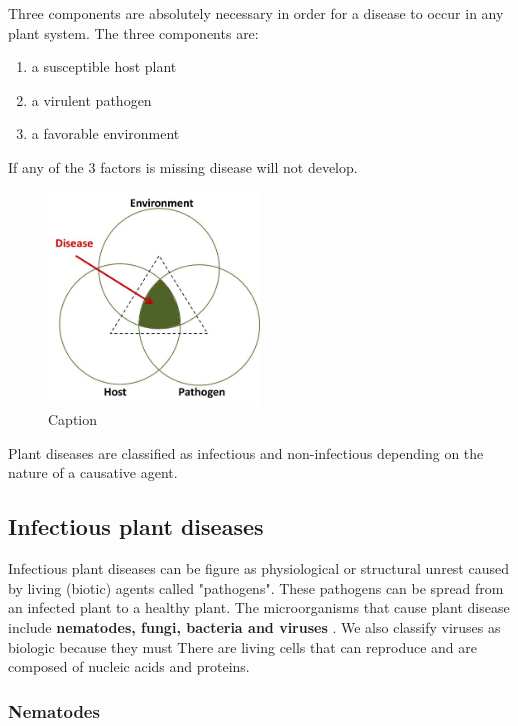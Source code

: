 Three components are absolutely necessary in order for a disease to occur in any plant system. The three components are:
 \begin{enumerate}
     \item a susceptible host plant
     \item a virulent pathogen
     \item a favorable environment
 \end{enumerate}
 If any of the 3 factors is missing disease will not develop.
 \begin{figure}[!h]
     \centering
     \includegraphics[width=0.5\textwidth]{chapters/chapter01/fig01/triangle.jpg}
     \caption{Caption}
     \label{fig:my_label}
 \end{figure}

Plant diseases are classified as infectious and non-infectious depending on the nature of a causative agent.


\subsection{Infectious  plant diseases }
\label{subsec:subsec01}

Infectious  plant diseases can be figure as physiological or structural unrest caused by living (biotic) agents called "pathogens". These pathogens can be spread from an infected plant to a healthy plant.
The microorganisms that cause plant disease include  \textbf{nematodes, fungi, bacteria and viruses} . We also classify viruses as biologic because they must There are living cells that can reproduce and are composed of nucleic acids and proteins.\cite{book1}

\subsubsection{Nematodes}
\label{subsubsec:subsubsec01}

